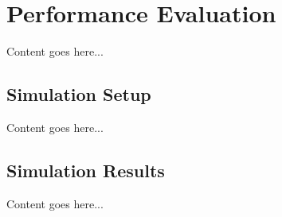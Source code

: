 \chapter{Performance Evaluation}
\label{chap:simulation} 

Content goes here... 

\section{Simulation Setup}

Content goes here... 

\section{Simulation Results}

Content goes here... 